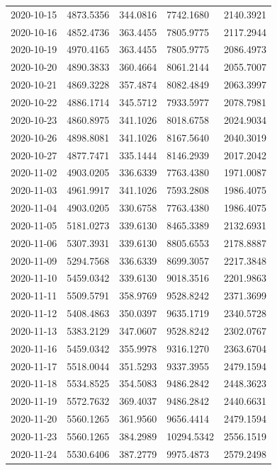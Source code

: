 {\begin{longtable}{lllll}
2020-10-15 & 4873.5356 & 344.0816 & 7742.1680 & 2140.3921 \\
2020-10-16 & 4852.4736 & 363.4455 & 7805.9775 & 2117.2944 \\
2020-10-19 & 4970.4165 & 363.4455 & 7805.9775 & 2086.4973 \\
2020-10-20 & 4890.3833 & 360.4664 & 8061.2144 & 2055.7007 \\
2020-10-21 & 4869.3228 & 357.4874 & 8082.4849 & 2063.3997 \\
2020-10-22 & 4886.1714 & 345.5712 & 7933.5977 & 2078.7981 \\
2020-10-23 & 4860.8975 & 341.1026 & 8018.6758 & 2024.9034 \\
2020-10-26 & 4898.8081 & 341.1026 & 8167.5640 & 2040.3019 \\
2020-10-27 & 4877.7471 & 335.1444 & 8146.2939 & 2017.2042 \\
2020-11-02 & 4903.0205 & 336.6339 & 7763.4380 & 1971.0087 \\
2020-11-03 & 4961.9917 & 341.1026 & 7593.2808 & 1986.4075 \\
2020-11-04 & 4903.0205 & 330.6758 & 7763.4380 & 1986.4075 \\
2020-11-05 & 5181.0273 & 339.6130 & 8465.3389 & 2132.6931 \\
2020-11-06 & 5307.3931 & 339.6130 & 8805.6553 & 2178.8887 \\
2020-11-09 & 5294.7568 & 336.6339 & 8699.3057 & 2217.3848 \\
2020-11-10 & 5459.0342 & 339.6130 & 9018.3516 & 2201.9863 \\
2020-11-11 & 5509.5791 & 358.9769 & 9528.8242 & 2371.3699 \\
2020-11-12 & 5408.4863 & 350.0397 & 9635.1719 & 2340.5728 \\
2020-11-13 & 5383.2129 & 347.0607 & 9528.8242 & 2302.0767 \\
2020-11-16 & 5459.0342 & 355.9978 & 9316.1270 & 2363.6704 \\
2020-11-17 & 5518.0044 & 351.5293 & 9337.3955 & 2479.1594 \\
2020-11-18 & 5534.8525 & 354.5083 & 9486.2842 & 2448.3623 \\
2020-11-19 & 5572.7632 & 369.4037 & 9486.2842 & 2440.6631 \\
2020-11-20 & 5560.1265 & 361.9560 & 9656.4414 & 2479.1594 \\
2020-11-23 & 5560.1265 & 384.2989 & 10294.5342 & 2556.1519 \\
2020-11-24 & 5530.6406 & 387.2779 & 9975.4873 & 2579.2498 \\

\end{longtable}}
